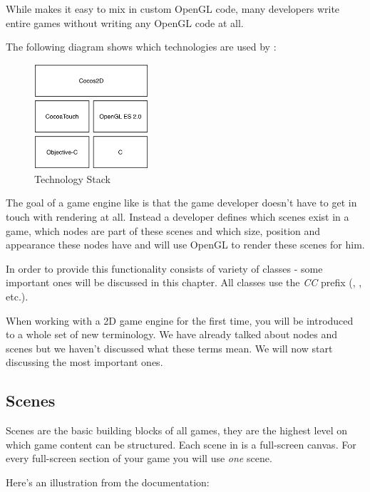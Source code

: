 While \cocos{} makes it easy to mix in custom OpenGL code, many \cocos{}
developers write entire games without writing any OpenGL code at all. 

The following diagram shows which technologies are used by
\cocos{}:

\begin{figure}[H]
		\centering
		\includegraphics[width=120pt]{images/cocos2d/TechnologyStack.png}     
		\caption{\cocos{} Technology Stack}
\end{figure}

The goal of a game engine like \cocos{} is that the game developer doesn't have
to get in touch with rendering at all. Instead a developer defines which scenes
exist in a game, which nodes are part of these scenes and which size, position
and appearance these nodes have and \cocos{} will use OpenGL to render these
scenes for him.

In order to provide this functionality \cocos{} consists of variety of classes -
some important ones will be discussed in this chapter. All \cocos{} classes use the \textit{CC} prefix (\ccscene{}, \ccnode{}, etc.).

When working with a 2D game engine for the first time, you will be introduced to
a whole set of new terminology. We have already talked about nodes and scenes
but we haven't discussed what these terms mean. We will now start discussing the
most important ones.

\subsection{Scenes}
Scenes are the basic building blocks of all \cocos{} games, they are the
highest level on which game content can be structured. Each scene in \cocos{} is
a full-screen canvas. For every full-screen section of your game you will use
\textit{one} scene.

Here's an illustration from the \cocos{} documentation:

